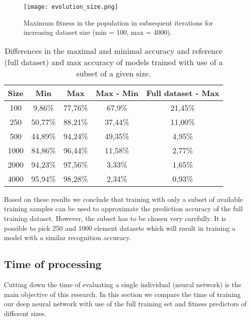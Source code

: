 \documentclass{llncs}
\begin{document}
\begin{figure}[t]
    \centering
    \texttt{[image: evolution\_size.png]}
    \caption{Maximum fitness in the population in subsequent iterations for increasing dataset size (min = 100, max = 4000).}
    \label{figure:fitness_sizes}
\end{figure}

\begin{table}

    \center
    \begin{tabular}{|c|c|c|c|c|}
        \hline
        Size & Min & Max & Max - Min & Full dataset - Max\\
        \hline
        100 & 9,86\% & 77,76\% & 67,9\% & 21,45\% \\
        250 & 50,77\% & 88,21\% & 37,44\% & 11,00\% \\
        500 & 44,89\% & 94,24\% & 49,35\% & 4,95\% \\
        1000 & 84,86\% & 96,44\% & 11,58\% & 2,77\% \\
        2000 & 94,23\% & 97,56\% & 3,33\% & 1,65\% \\
        4000 & 95,94\% & 98,28\% & 2,34\% & 0,93\% \\
        \hline
    \end{tabular}

    \caption{Differences in the maximal and minimal accuracy and reference (full dataset) and max accuracy of models trained with use of a subset of a given size.}
    \label{table:fp_fitness_diff}

\end{table}

Based on these results we conclude that training with only a subset of available training samples can be used to approximate the prediction accuracy of the full training dataset. However, the subset has to be chosen very carefully. It is possible to pick 250 and 1000 element datasets which will result in training a model with a similar recognition accuracy.

\subsection{Time of processing}

Cutting down the time of evaluating a single individual (neural network) is the main objective of this research. In this section we compare the time of training our deep neural network with use of the full training set and fitness predictors of different sizes.
\end{document}
